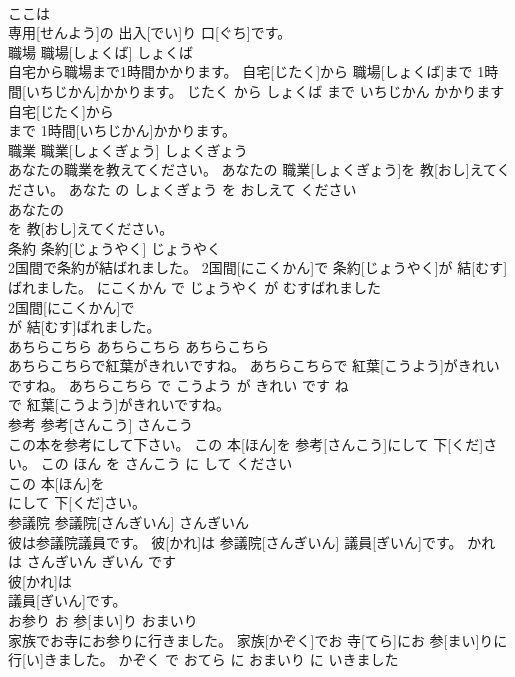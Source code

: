 \documentclass[8pt]{extreport}
\begin{document}
\begin{CJK}{UTF8}{min}
\\	ここは
\\	専用[せんよう]の 出入[でい]り 口[ぐち]です。			
\\	職場	職場[しょくば]	しょくば	
\\	自宅から職場まで1時間かかります。	自宅[じたく]から 職場[しょくば]まで 1時間[いちじかん]かかります。	じたく から しょくば まで いちじかん かかります	
\\	自宅[じたく]から
\\	まで 1時間[いちじかん]かかります。			
\\	職業	職業[しょくぎょう]	しょくぎょう	
\\	あなたの職業を教えてください。	あなたの 職業[しょくぎょう]を 教[おし]えてください。	あなた の しょくぎょう を おしえて ください	
\\	あなたの
\\	を 教[おし]えてください。			
\\	条約	条約[じょうやく]	じょうやく	
\\	2国間で条約が結ばれました。	2国間[にこくかん]で 条約[じょうやく]が 結[むす]ばれました。	にこくかん で じょうやく が むすばれました	
\\	2国間[にこくかん]で
\\	が 結[むす]ばれました。			
\\	あちらこちら	あちらこちら	あちらこちら	
\\	あちらこちらで紅葉がきれいですね。	あちらこちらで 紅葉[こうよう]がきれいですね。	あちらこちら で こうよう が きれい です ね	
\\	で 紅葉[こうよう]がきれいですね。			
\\	参考	参考[さんこう]	さんこう	
\\	この本を参考にして下さい。	この 本[ほん]を 参考[さんこう]にして 下[くだ]さい。	この ほん を さんこう に して ください	
\\	この 本[ほん]を
\\	にして 下[くだ]さい。			
\\	参議院	参議院[さんぎいん]	さんぎいん	
\\	彼は参議院議員です。	彼[かれ]は 参議院[さんぎいん] 議員[ぎいん]です。	かれ は さんぎいん ぎいん です	
\\	彼[かれ]は
\\	議員[ぎいん]です。			
\\	お参り	お 参[まい]り	おまいり	
\\	家族でお寺にお参りに行きました。	家族[かぞく]でお 寺[てら]にお 参[まい]りに 行[い]きました。	かぞく で おてら に おまいり に いきました	

\end{CJK}
\end{document}
